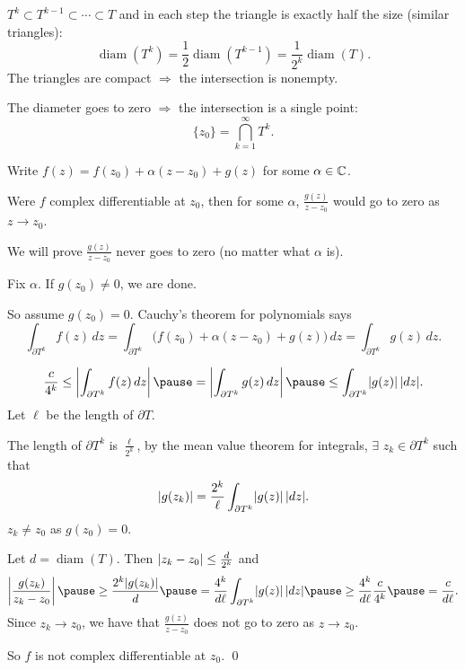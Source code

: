 \documentclass[10pt,aspectratio=169]{beamer}
\begin{document}
\begin{frame}
$T^k \subset T^{k-1} \subset \cdots \subset T$
and in each step the triangle is exactly half the size (similar triangles):
\pause
\[
\operatorname{diam}(T^k) =
\frac{1}{2} \operatorname{diam}(T^{k-1})
=
\frac{1}{2^k} \operatorname{diam}(T) .
\]
\pause
The triangles are compact $\Rightarrow$ the intersection is
nonempty.

\pause
The diameter goes to zero $\Rightarrow$ the intersection is a single point:
\[
\{ z_0 \} = \bigcap_{k=1}^\infty T^k .
\]
\pause

Write
$f(z) = f(z_0) + \alpha (z-z_0) + g(z)$ for some $\alpha \in {\mathbb{C}}$.

\medskip
\pause

Were $f$ complex differentiable at $z_0$, then for some $\alpha$,
$\frac{g(z)}{z-z_0}$ would go to zero as $z \to z_0$.

\medskip
\pause

We will prove
$\frac{g(z)}{z-z_0}$ never goes to zero (no matter what $\alpha$ is).

\medskip
\pause

Fix $\alpha$.  \pause  If $g(z_0) \not= 0$, we are done.

\medskip
\pause

So assume $g(z_0) = 0$.  \pause
Cauchy's theorem for polynomials says
\[
\int_{\partial T^k} f(z) \, dz =
\int_{\partial T^k} \bigl( f(z_0) + \alpha (z-z_0) + g(z) \bigr) \, dz =
\int_{\partial T^k} g(z) \, dz .
\]
\end{frame}

\begin{frame}
\[
\frac{c}{4^k} \leq
\abs{
\int_{\partial T^k} f(z) \, dz
}
\pause
=
\abs{
\int_{\partial T^k} g(z) \, dz 
}
\pause
\leq
\int_{\partial T^k} \sabs{g(z)} \, \sabs{dz} .
\]
\pause
Let $\ell$ be the length of $\partial T$.

\medskip
\pause

The length of $\partial T^k$ is $\frac{\ell}{2^k}$,
\pause
by the mean value theorem for integrals,
$\exists$ $z_k \in \partial T^k$ such that
\[
\lvert {g(z_k)} \rvert = 
\frac{2^k}{\ell}
\int_{\partial T^k} \lvert {g(z)} \rvert \, \lvert {dz} \rvert .
\]
\pause
$z_k \not= z_0$ as $g(z_0)=0$.

\medskip
\pause

Let $d = \operatorname{diam}(T)$.  Then
$\lvert {z_k-z_0} \rvert \leq \frac{d}{2^k}$ and
\pause
\[
\abs{\frac{g(z_k)}{z_k-z_0}}
\pause
\geq
\frac{2^k\sabs{g(z_k)}}{d}
\pause
=
\frac{4^k}{d \ell}
\int_{\partial T^k} \sabs{g(z)} \, \sabs{dz}
\pause
\geq
\frac{4^k}{d \ell}
\frac{c}{4^k}
\pause
= \frac{c}{d \ell} .
\]
\pause
Since $z_k \to z_0$, we have that $\frac{g(z)}{z-z_0}$ does not 
go to zero as $z \to z_0$.
\pause
\medskip

So $f$ is not complex differentiable at $z_0$.
\qed
\end{frame}
\end{document}
